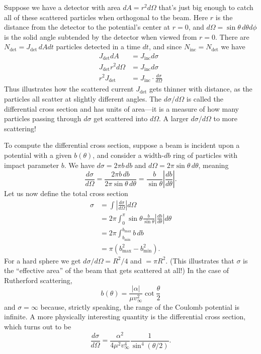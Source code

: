\documentclass[../p111main.tex]{subfiles}
\begin{document}
Suppose we have a detector with area $dA = r^2 d\Omega$ that's just big enough to catch all of these scattered particles when orthogonal to the beam.
Here $r$ is the distance from the detector to the potential's center at $r=0$, and $d\Omega = \sin \theta \,d\theta d\phi$ is the solid angle subtended by the detector when viewed from $r=0$.
There are $N_\textrm{det} = J_\textrm{det} \,dA dt$ particles detected in a time $dt$, and since $N_\textrm{inc} = N_\textrm{det}$ we have
\begin{align*}
    J_\textrm{det} dA &= J_\textrm{inc} d\sigma \\
    J_\textrm{det} r^2 d\Omega &= J_\textrm{inc} d\sigma \\
    r^2 J_\textrm{det} &= J_\textrm{inc} \cdot \frac{d\sigma}{d\Omega}
\end{align*}
Thus illustrates how the scattered current $J_\text{det}$ gets thinner with distance, as the particles all scatter at slightly different angles.
The $d\sigma / d\Omega$ is called the differential cross section and has units of area---it is a measure of how many particles passing through $d\sigma$ get scattered into $d\Omega$.
A larger $d\sigma / d\Omega$ to more scattering!

To compute the differential cross section, suppose a beam is incident upon a potential with a given $b(\theta)$, and consider a width-$db$ ring of particles with impact parameter $b$.
We have $d\sigma = 2\pi b \,db$ and $d\Omega = 2\pi \sin \theta \,d\theta$, meaning
\[ \frac{d\sigma}{d\Omega} = \frac{2\pi b \,db}{2\pi \sin \theta \,d\theta} = \frac{b}{\sin\theta} \left| \frac{db}{d\theta} \right|. \]
Let us now define the total cross section
\begin{align*}
    \sigma &= \int \left| \frac{d\sigma}{d\Omega} \right| d\Omega \\
    &= 2\pi \int_0^\pi \sin\theta \frac{b}{\sin\theta} \left| \frac{db}{d\theta} \right| d\theta \\
    &= 2\pi \int_{b_\textrm{min}}^{b_\textrm{max}} b \,db \\
    &= \pi \left( b_\textrm{max}^2 - b_\textrm{min}^2 \right).
\end{align*}
For a hard sphere we get $d\sigma / d\Omega = R^2 / 4$ and $ = \pi R^2$.
(This illustrates that $\sigma$ is the ``effective area'' of the beam that gets scattered at all!)
In the case of Rutherford scattering,
\[ b(\theta) = \frac{|\alpha|}{\mu v_\infty^2} \cot \frac{\theta}{2} \]
and $\sigma = \infty$ because, strictly speaking, the range of the Coulomb potential is infinite.
A more physically interesting quantity is the differential cross section, which turns out to be
\[ \frac{d\sigma}{d\Omega} = \frac{\alpha^2}{4\mu^2 v_\infty^{4}} \frac{1}{\sin^{4} (\theta / 2)}. \]
\end{document}
